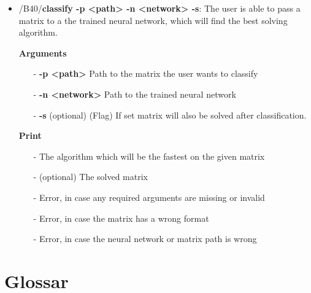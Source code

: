 \documentclass[parskip=full]{scrartcl}
\begin{document}
\begin{itemize}
\item/B40/\textbf{classify -p <path> -n <network> -s}:
\newline The user is able to pass a matrix to a the trained neural network, which will find the best solving algorithm.

\textbf{Arguments}
	\begin{itemize}
	\item[-]\textbf{-p <path>} Path to the matrix the user wants to classify
	\item[-]\textbf{-n <network>} Path to the trained neural network
	\item[-]\textbf{-s} (optional) (Flag) If set matrix will also be solved after classification.
	\end{itemize}

\textbf{Print}
	\begin{itemize}
	\item[-]The algorithm which will be the fastest on the given matrix
	\item[-](optional) The solved matrix
	\item[-]Error, in case any required arguments are missing or invalid
	\item[-]Error, in case the matrix has a wrong format
	\item[-]Error, in case the neural network or matrix path is wrong
	\end{itemize}
\end{itemize}
\clearpage

\section{Glossar}

%
\printnoidxglossaries
\end{document}
